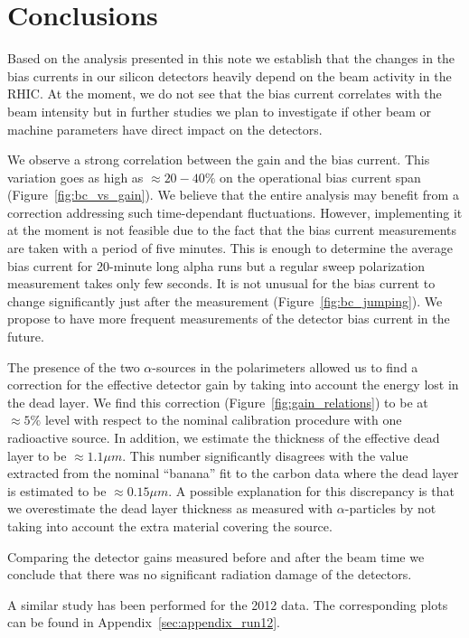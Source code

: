 \documentclass[a4paper,12pt]{article}
\begin{document}
\section{Conclusions}

Based on the analysis presented in this note we establish that the changes in
the bias currents in our silicon detectors heavily depend on the beam activity
in the RHIC. At the moment, we do not see that the bias current correlates with
the beam intensity but in further studies we plan to investigate if other beam
or machine parameters have direct impact on the detectors.

We observe a strong correlation between the gain and the bias current.
This variation goes as high as $\approx 20-40\%$ on the operational bias current
span (Figure~\ref{fig:bc_vs_gain}). We believe that the entire analysis
may benefit from a correction addressing such time-dependant fluctuations.
However, implementing it at the moment is not feasible due to
the fact that the bias current measurements are taken with a period of five minutes.
This is enough to determine the average bias current for 20-minute long alpha runs but
a regular sweep polarization measurement takes only few seconds. It is not
unusual for the bias current to change significantly just after the measurement (Figure~\ref{fig:bc_jumping}).
We propose to have more frequent measurements of the detector bias current in the future.

The presence of the two $\alpha$-sources in the polarimeters allowed us to find
a correction for the effective detector gain by taking into account the energy
lost in the dead layer. We find this correction (Figure~\ref{fig:gain_relations}) to be at $\approx 5\%$ level
with respect to the nominal calibration procedure with one radioactive source.
In addition, we estimate the thickness of the effective dead layer to be
$\approx 1.1\mu m$. This number significantly disagrees with the value extracted
from the nominal ``banana'' fit to the carbon data where the dead layer is
estimated to be $\approx 0.15\mu m$. A possible explanation for this discrepancy
is that we overestimate the dead layer thickness as measured with
$\alpha$-particles by not taking into account the extra material covering the
source.

Comparing the detector gains measured before and after the beam time we conclude
that there was no significant radiation damage of the detectors.

A similar study has been performed for the 2012 data. The corresponding plots
can be found in Appendix~\ref{sec:appendix_run12}.
\end{document}
